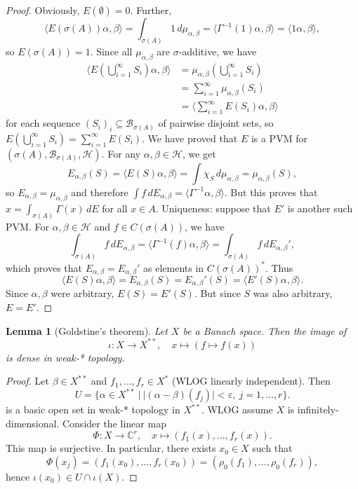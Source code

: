 \documentclass[10pt, a4paper]{article}
\newtheorem{lemma}[thm]{Lemma}
\newenvironment{noticeC}{%
  \tcolorbox[%
  notitle,
  empty,
  enhanced,  %
  breakable,
  coltext=black, 
  fontupper=\rmfamily,
  noparskip,
  sharp corners,
  boxrule=-1pt,  %
  frame hidden,
  left=7pt,  %
  right=7pt,
  top=5pt,
  bottom=5pt,
  before skip=2.5ex plus 2pt,
  after skip=2.5ex plus 2pt,
  overlay unbroken and last={%
  },
  ]}
{\endtcolorbox}
\newenvironment{myproof}%
  {\begin{noticeC}\begin{proof}}%
  {\end{proof}\end{noticeC}}
\newcommand{\C}{\mathbb {C}}
\begin{document}
\begin{myproof}
  Obviously, $E(\emptyset) = 0$. Further, 
  $$\langle E(\sigma(A)) \alpha, \beta\rangle = \int_{\sigma(A)} 1\, d\mu_{\alpha, \beta} = \langle \Gamma^{-1} (1) \alpha, \beta\rangle = \langle 1 \alpha, \beta\rangle,$$
  so $E(\sigma(A)) = 1$. Since all $\mu_{\alpha, \beta}$ are $\sigma$-additive, we have 
  \begin{align*}
    \langle E\left(\bigcup_{i = 1} ^\infty S_i\right) \alpha, \beta \rangle &= \mu_{\alpha, \beta} \left(\bigcup_{i = 1} ^\infty S_i\right)\\
    &= \sum_{i = 1} ^\infty \mu_{\alpha, \beta} (S_i)\\
    &= \langle \sum_{i = 1}^\infty E(S_i)\alpha, \beta \rangle
  \end{align*}
  for each sequence $(S_i)_i \subseteq \mathcal{B}_{\sigma(A)}$ of pairwise disjoint sets, so $E\left(\bigcup_{i = 1} ^\infty S_i\right) = \sum_{i = 1}^\infty E(S_i)$.
  We have proved that $E$ is a PVM for $(\sigma(A), \mathcal{B}_{\sigma(A)}, \mathcal{H})$. For any $\alpha, \beta \in \mathcal{H}$, we get 
  $$E_{\alpha, \beta} (S) = \langle E(S)\alpha, \beta\rangle = \int \chi_S \, d\mu_{\alpha, \beta} = \mu_{\alpha, \beta} (S),$$
  so $E_{\alpha, \beta} = \mu_{\alpha, \beta}$ and therefore $\int f\, dE_{\alpha, \beta} = \langle \Gamma^{-1} \alpha, \beta\rangle$.
  But this proves that $x = \int_{\sigma(A)} \Gamma(x)\, dE$ for all $x \in A$.
  Uniqueness: suppose that $E'$ is another such PVM. For $\alpha, \beta \in \mathcal{H}$ and $f \in C(\sigma(A))$, we have 
  $$\int_{\sigma(A)} f\, dE_{\alpha, \beta} = \langle \Gamma^{-1} (f)\alpha, \beta\rangle = \int_{\sigma(A)} f\, dE_{\alpha, \beta}',$$
  which proves that $E_{\alpha, \beta} = E_{\alpha, \beta} '$ as elements in $C(\sigma(A))^*.$
  Thus $$\langle E(S)\alpha, \beta\rangle = E_{\alpha, \beta} (S) = E_{\alpha, \beta} '(S) = \langle E'(S) \alpha, \beta \rangle.$$
  Since $\alpha, \beta$ were arbitrary, $E(S) = E'(S)$. But since $S$ was also arbitrary, $E = E'$.
\end{myproof}

\begin{lemma}[Goldstine's theorem]
  Let $X$ be a Banach space. Then the image of 
  $$\iota: X \to X^{**},\quad x \mapsto (f \mapsto f(x))$$
  is dense in weak-* topology.
\end{lemma}

\begin{myproof}
  Let $\beta \in X^{**}$ and $f_1, \dots, f_r \in X^*$ (WLOG linearly independent).
  Then 
  $$U = \{\alpha \in X^{**}\ |\ |(\alpha - \beta) (f_j)| < \varepsilon,\ j = 1, \dots, r\}.$$
  is a basic open set in weak-* topology in $X^{**}$.
  WLOG assume $X$ is infinitely-dimensional. Consider the linear map 
  $$\Phi: X \to \C^r,\quad x \mapsto (f_1 (x),\dots, f_r (x)).$$
  This map is surjective.
  In particular, there exists $x_{0} \in X$ such that 
  $$\Phi(x_j) = (f_1 (x_0), \dots, f_r (x_0)) = (\rho_0 (f_1), \dots, \rho_0 (f_r)),$$
  hence $\iota (x_0) \in U \cap \iota (X)$.
\end{myproof}
\end{document}
